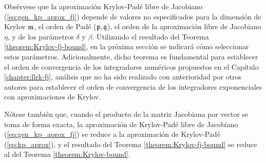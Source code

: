 Obsérvese que la aproximación Krylov-Padé libre de Jacobiano (\ref{eq:gen_kp_aprox_fj}) depende de valores no especificados para la dimensión de Krylov $\mathfrak{m}$, el orden de Padé ($\mathfrak{p},\mathfrak{q}$), el orden de la aproximación libre de Jacobiano $\eta$, y de los parámetros $\delta$ y $\beta$. Utilizando el resultado del Teorema \ref{theorem:Krylov-fj-bound}, en la próxima sección se indicará cómo seleccionar estos parámetros. Adicionalmente, dicho teorema es fundamental para establecer el orden de convergencia de los integradores numéricos propuestos en el Capítulo \ref{chapter:llrk-fj}, análisis que no ha sido realizado con anterioridad por otros autores para establecer el orden de convergencia de los integradores exponenciales con aproximaciones de Krylov.


Nótese también que, cuando el producto de la matriz Jacobiana por vector se toma de forma exacta, la aproximación de Krylov-Padé libre de Jacobiano (\ref{eq:gen_kp_aprox_fj}) se reduce a la aproximación de Krylov-Padé (\ref{eq:kp_aprox}), y el resultado del Teorema \ref{theorem:Krylov-fj-bound} se reduce al del Teorema \ref{theorem:Krylov-bound}.

